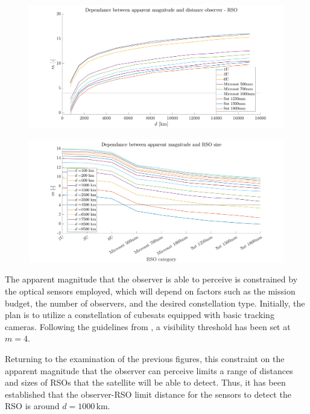 \begin{figure}[H]
    \centering
    \includegraphics[width=\textwidth]{Figures/mapp-distance.png}
    \caption{}
    \label{fig:mapp-distance}
\end{figure}
\begin{figure}[H]
    \centering
    \includegraphics[width=\textwidth]{Figures/size-mapp.png}
    \caption{}
    \label{fig:mapp-size}
\end{figure} 

The apparent magnitude that the observer is able to perceive is constrained by the optical sensors employed, which will depend on factors such as the mission budget, the number of observers, and the desired constellation type. Initially, the plan is to utilize a constellation of cubesats equipped with basic tracking cameras. Following the guidelines from \cite{limmapp}, a visibility threshold has been set at $m=4$.

Returning to the examination of the previous figures, this constraint on the apparent magnitude that the observer can perceive limits a range of distances and sizes of RSOs that the satellite will be able to detect. Thus, it has been established that the observer-RSO limit distance for the sensors to detect the RSO is around $d=1000 \, \text{km}$.

